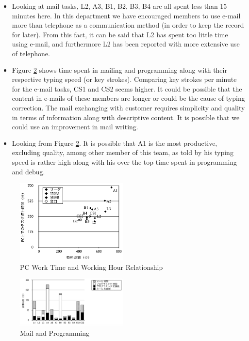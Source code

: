 \documentclass [paper]{ieice}
\begin{document}
\begin{itemize}
	\item Looking at mail tasks, L2, A3, B1, B2, B3, B4 are all spent less than 15 minutes here. In this department we have encouraged members to use e-mail more than telephone as a communication method (in order to keep the record for later). From this fact, it can be said that L2 has spent too little time using e-mail, and furthermore L2 has been reported with more extensive use of telephone.
	\item Figure \ref{fig11} shows time spent in mailing and programming along with their respective typing speed (or key strokes). Comparing key strokes per minute for the e-mail tasks, CS1 and CS2 seems higher. It could be possible that the content in e-mails of these members are longer or could be the cause of typing correction. The mail exchanging with customer requires simplicity and quality in terms of information along with descriptive content. It is possible that we could use an improvement in mail writing.
	\item Looking from Figure \ref{fig11}. It is possible that A1 is the most productive, excluding quality, among other member of this team, as told by his typing speed is rather high along with his over-the-top time spent in programming and debug.
\end{itemize}

\begin{figure}[h]
	\centering	
\includegraphics[width=0.5\textwidth]{fig10}
	\caption{PC Work Time and Working Hour Relationship}
	\label{fig10}
\end{figure}

\begin{figure}[h]
	\centering	
\includegraphics[width=0.5\textwidth]{fig11}
	\caption{Mail and Programming}
	\label{fig11}
\end{figure}
\end{document}
